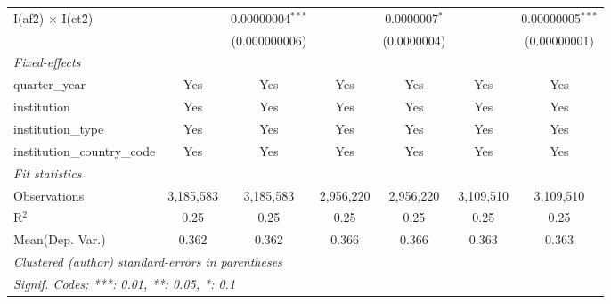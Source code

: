 \begin{tabular}{lcccccc}
   I(af\^2) $\times$ I(ct\^2)         &               & 0.00000004$^{***}$ &               & 0.0000007$^{*}$  &               & 0.00000005$^{***}$\\   
                                      &               & (0.000000006)      &               & (0.0000004)      &               & (0.00000001)\\   
   \midrule
   \emph{Fixed-effects}\\
   quarter\_year                      & Yes           & Yes                & Yes           & Yes              & Yes           & Yes\\  
   institution                        & Yes           & Yes                & Yes           & Yes              & Yes           & Yes\\  
   institution\_type                  & Yes           & Yes                & Yes           & Yes              & Yes           & Yes\\  
   institution\_country\_code         & Yes           & Yes                & Yes           & Yes              & Yes           & Yes\\  
   \midrule
   \emph{Fit statistics}\\
   Observations                       & 3,185,583     & 3,185,583          & 2,956,220     & 2,956,220        & 3,109,510     & 3,109,510\\  
   R$^2$                              & 0.25          & 0.25               & 0.25          & 0.25             & 0.25          & 0.25\\  
Mean(Dep. Var.) & 0.362 & 0.362 & 0.366 & 0.366 & 0.363 & 0.363 \\
   \midrule \midrule
   \multicolumn{7}{l}{\emph{Clustered (author) standard-errors in parentheses}}\\
   \multicolumn{7}{l}{\emph{Signif. Codes: ***: 0.01, **: 0.05, *: 0.1}}\\
\end{tabular}
\par\endgroup
